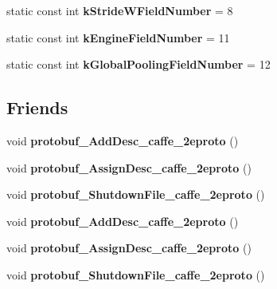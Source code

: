 \begin{DoxyCompactItemize}
\item 
\mbox{\label{classcaffe_1_1_pooling_parameter_a7d315f8b6b704e6d37fe062346d8021e}} 
static const int {\bfseries k\+Stride\+W\+Field\+Number} = 8
\item 
\mbox{\label{classcaffe_1_1_pooling_parameter_aba8ef77da0ef86847c38a85cd973f3fe}} 
static const int {\bfseries k\+Engine\+Field\+Number} = 11
\item 
\mbox{\label{classcaffe_1_1_pooling_parameter_a5ef4fd75e28133bd2c8bf9b7c3637558}} 
static const int {\bfseries k\+Global\+Pooling\+Field\+Number} = 12
\end{DoxyCompactItemize}
\subsection*{Friends}
\begin{DoxyCompactItemize}
\item 
\mbox{\label{classcaffe_1_1_pooling_parameter_a2670a9c8ffd0e5105cf7522cd6f8613d}} 
void {\bfseries protobuf\+\_\+\+Add\+Desc\+\_\+caffe\+\_\+2eproto} ()
\item 
\mbox{\label{classcaffe_1_1_pooling_parameter_a7f145bddbdde78003d27e42c7e003d23}} 
void {\bfseries protobuf\+\_\+\+Assign\+Desc\+\_\+caffe\+\_\+2eproto} ()
\item 
\mbox{\label{classcaffe_1_1_pooling_parameter_a026784a8e4e76f1b4daf9d033d2ece83}} 
void {\bfseries protobuf\+\_\+\+Shutdown\+File\+\_\+caffe\+\_\+2eproto} ()
\item 
\mbox{\label{classcaffe_1_1_pooling_parameter_a2670a9c8ffd0e5105cf7522cd6f8613d}} 
void {\bfseries protobuf\+\_\+\+Add\+Desc\+\_\+caffe\+\_\+2eproto} ()
\item 
\mbox{\label{classcaffe_1_1_pooling_parameter_a7f145bddbdde78003d27e42c7e003d23}} 
void {\bfseries protobuf\+\_\+\+Assign\+Desc\+\_\+caffe\+\_\+2eproto} ()
\item 
\mbox{\label{classcaffe_1_1_pooling_parameter_a026784a8e4e76f1b4daf9d033d2ece83}} 
void {\bfseries protobuf\+\_\+\+Shutdown\+File\+\_\+caffe\+\_\+2eproto} ()
\end{DoxyCompactItemize}


